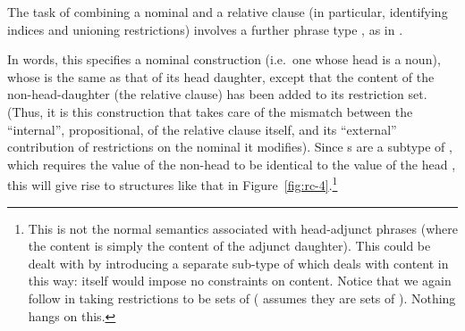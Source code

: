 \documentclass[output=paper
 	        ,biblatex
                ,babelshorthands
                ,newtxmath
                ,draftmode
                ,colorlinks, citecolor=brown
]{langscibook}
\begin{document}
The task of combining a nominal and a relative clause (in particular, identifying indices
and unioning restrictions) involves a further phrase type ,
as in .
\begin{exe}\ex\label{x:rc-49}
 \end{exe}

In words, this specifies a nominal construction (i.e.\ one whose head is
a noun), whose  is the same as that of its head daughter, except that the
content of the non-head-daughter (the relative clause) has been added to its restriction
set. (Thus, it is this construction that takes care of the mismatch between the
``internal'', propositional,  of the relative clause itself, and its
``external'' contribution of restrictions on the nominal it modifies).  Since
s are a subtype of , which
requires the  value of the non-head to be identical to the 
value of the head \citep[475]{Sag:97}, this will give rise to structures like that in
Figure~\ref{fig:rc-4}.\footnote{This is not the normal semantics associated with head-adjunct
  phrases (where the content is simply the content of the adjunct daughter). This could be
  dealt with by introducing a separate sub-type of  which deals
  with content in this way:  itself would impose no constraints on
  content. Notice that we again follow \cite{Ginzburg:Sag:00} in taking restrictions to be
  sets of  (\citealt{Sag:97} assumes they are sets of
  ). Nothing hangs on this.}
\end{document}
